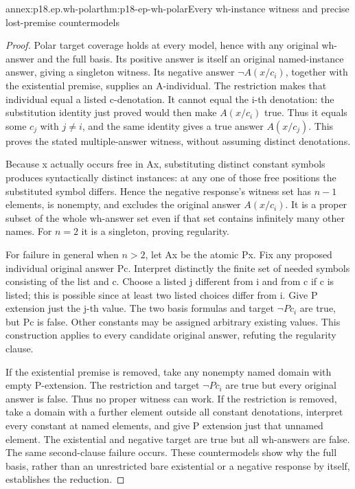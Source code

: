 \begin{annexitem}{annex:p18.ep.wh-polar}{thm:p18-ep-wh-polar}{Every wh-instance witness and precise lost-premise countermodels}
\begin{proof}
Polar target coverage holds at every model, hence with any original
wh-answer and the full basis. Its positive answer is itself an
original named-instance answer, giving a singleton witness.
Its negative answer \(\neg A(x/c_i)\), together with the existential
premise, supplies an A-individual. The restriction makes that individual
equal a listed c-denotation. It cannot equal the i-th denotation:
the substitution identity just proved would then make \(A(x/c_i)\)
true. Thus it equals some \(c_j\) with \(j\ne i\), and the same
identity gives a true answer \(A(x/c_j)\). This proves the stated
multiple-answer witness, without assuming distinct denotations.

Because x actually occurs free in Ax, substituting distinct constant
symbols produces syntactically distinct instances: at any one of those
free positions the substituted symbol differs. Hence the negative
response's witness set has \(n-1\) elements, is nonempty, and excludes
the original answer \(A(x/c_i)\). It is a proper subset of the whole
wh-answer set even if that set contains infinitely many other names.
For \(n=2\) it is a singleton, proving regularity.

For failure in general when \(n>2\), let Ax be the atomic Px.
Fix any proposed individual original answer Pc. Interpret distinctly
the finite set of needed symbols consisting of the list and c.
Choose a listed j different from i and from c if c is listed; this
is possible since at least two listed choices differ from i. Give
P extension just the j-th value. The two basis formulas and target
\(\neg Pc_i\) are true, but Pc is false. Other constants may be
assigned arbitrary existing values. This construction applies to
every candidate original answer, refuting the regularity clause.

If the existential premise is removed, take any nonempty named domain
with empty P-extension. The restriction and target \(\neg Pc_i\)
are true but every original answer is false. Thus no proper witness
can work. If the restriction is removed, take a domain with a further
element outside all constant denotations, interpret every constant
at named elements, and give P extension just that unnamed element.
The existential and negative target are true but all wh-answers are
false. The same second-clause failure occurs. These countermodels
show why the full basis, rather than an unrestricted bare existential
or a negative response by itself, establishes the reduction.
\end{proof}
\end{annexitem}
